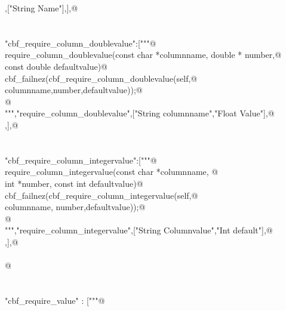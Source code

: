 \documentclass[10pt,a4paper,twoside,notitlepage]{article}
\begin{document}
\begin{flushleft}
\begin{minipage}{\linewidth}
\begin{list}{}{}
\mbox{},["String Name"],],@\\
\mbox{}\verb@@\\
\mbox{}\verb@@\\
\mbox{}\verb@"cbf_require_column_doublevalue":["""@\\
\mbox{}\verb@%apply double *OUTPUT { double *number} require_column_doublevalue;@\\
\mbox{}\verb@void require_column_doublevalue(const char *columnname, double * number,@\\
\mbox{}\verb@             const double defaultvalue){@\\
\mbox{}\verb@    cbf_failnez(cbf_require_column_doublevalue(self,@\\
\mbox{}\verb@                  columnname,number,defaultvalue));@\\
\mbox{}\verb@    }@\\
\mbox{}\verb@""","require_column_doublevalue",["String columnname","Float Value"],@\\
\mbox{},],@\\
\mbox{}\verb@@\\
\mbox{}\verb@@\\
\mbox{}\verb@"cbf_require_column_integervalue":["""@\\
\mbox{}\verb@%apply int *OUTPUT {int *number}  require_column_integervalue;@\\
\mbox{}\verb@void require_column_integervalue(const char *columnname, @\\
\mbox{}\verb@                       int *number, const int defaultvalue){@\\
\mbox{}\verb@    cbf_failnez(cbf_require_column_integervalue(self,@\\
\mbox{}\verb@           columnname, number,defaultvalue));@\\
\mbox{}\verb@    }@\\
\mbox{}\verb@""","require_column_integervalue",["String Columnvalue","Int default"],@\\
\mbox{},],@\\
\mbox{}\verb@@\\
\mbox{}\verb@           @\\
\mbox{}\verb@@\\
\mbox{}\verb@@\\
\mbox{}\verb@"cbf_require_value" : ["""@\\
\mbox{}\verb@@\\

\end{list}
\end{minipage}
\end{flushleft}
\end{document}
